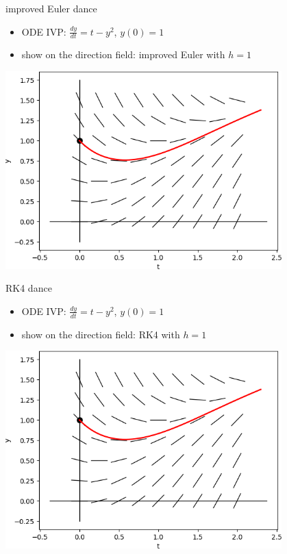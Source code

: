 \documentclass[urlcolor=blue,dvipsnames]{beamer}
\begin{document}
\begin{frame}{improved Euler dance}

\begin{itemize}
\item ODE IVP: $\frac{dy}{dt} = t-y^2$, $y(0)=1$
\item show on the direction field: improved Euler with $h=1$
\end{itemize}

\hfill \includegraphics[width=0.8\textwidth]{figs/for-rk4-dir-field}
\end{frame}


\begin{frame}{RK4 dance}

\begin{itemize}
\item ODE IVP: $\frac{dy}{dt} = t-y^2$, $y(0)=1$
\item show on the direction field: RK4 with $h=1$
\end{itemize}

\hfill \includegraphics[width=0.8\textwidth]{figs/for-rk4-dir-field}
\end{frame}
\end{document}
